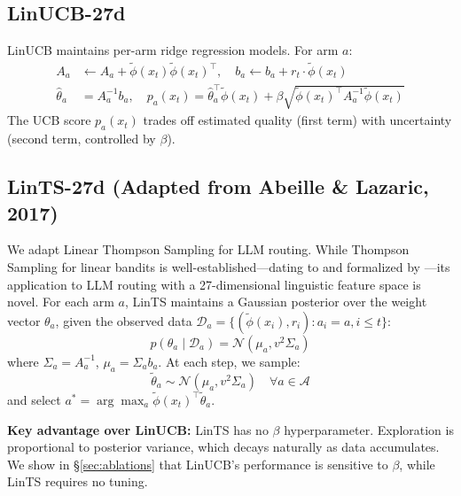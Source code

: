 \subsection{LinUCB-27d}
\label{sec:linucb}

LinUCB \citep{li2010contextual} maintains per-arm ridge regression models. For arm $a$:
\begin{align}
A_a &\leftarrow A_a + \tilde{\phi}(x_t)\tilde{\phi}(x_t)^\top, \quad
b_a \leftarrow b_a + r_t \cdot \tilde{\phi}(x_t) \\
\hat{\theta}_a &= A_a^{-1} b_a, \quad
p_a(x_t) = \hat{\theta}_a^\top \tilde{\phi}(x_t) + \beta \sqrt{\tilde{\phi}(x_t)^\top A_a^{-1} \tilde{\phi}(x_t)}
\end{align}
The UCB score $p_a(x_t)$ trades off estimated quality (first term) with uncertainty (second term, controlled by $\beta$).

\subsection{LinTS-27d (Adapted from Abeille \& Lazaric, 2017)}
\label{sec:lints}

We adapt Linear Thompson Sampling \citep{abeille2017linear} for LLM routing. While Thompson Sampling for linear bandits is well-established\mbox{---}dating to \citet{agrawal2013thompson} and formalized by \citet{abeille2017linear}\mbox{---}its application to LLM routing with a 27-dimensional linguistic feature space is novel. For each arm $a$, LinTS maintains a Gaussian posterior over the weight vector $\theta_a$, given the observed data $\mathcal{D}_a = \{(\tilde{\phi}(x_i), r_i) : a_i = a, i \leq t\}$:
\begin{equation}
p(\theta_a \mid \mathcal{D}_a) = \mathcal{N}(\mu_a, v^2 \Sigma_a)
\end{equation}
where $\Sigma_a = A_a^{-1}$, $\mu_a = \Sigma_a b_a$. At each step, we sample:
\begin{equation}
\tilde{\theta}_a \sim \mathcal{N}(\mu_a, v^2 \Sigma_a) \quad \forall a \in \mathcal{A}
\end{equation}
and select $a^* = \arg\max_{a} \tilde{\phi}(x_t)^\top \tilde{\theta}_a$.

\textbf{Key advantage over LinUCB:} LinTS has no $\beta$ hyperparameter. Exploration is proportional to posterior variance, which decays naturally as data accumulates. We show in \S\ref{sec:ablations} that LinUCB's performance is sensitive to $\beta$, while LinTS requires no tuning.

